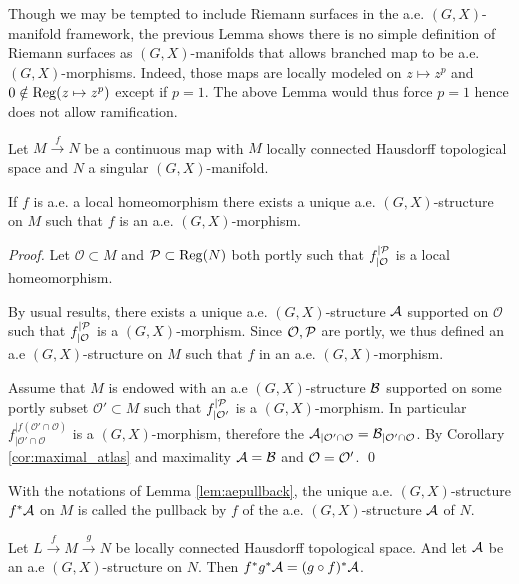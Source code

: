                 \begin{rem}
                 Though we may be tempted to include Riemann surfaces in the a.e. $(G,X)$-manifold framework, the previous Lemma shows there is no simple definition of Riemann surfaces as $(G,X)$-manifolds that allows branched map to be a.e. $(G,X)$-morphisms. Indeed, those maps are locally modeled on $z\mapsto z^p$ and $0\notin \reg(z\mapsto z^p)$ except if $p=1$. The above Lemma would thus force $p=1$ hence does not allow ramification.  
                \end{rem}
                \begin{lem}\label{lem:aepullback}
                    Let $M\xrightarrow{f} N$ be a continuous map with $M$ locally connected Hausdorff topological space and $N$ a singular $(G,X)$-manifold. 
                    
                    If $f$ is a.e. a local homeomorphism there exists a unique a.e. $(G,X)$-structure on $M$ such that $f$ is an a.e. $(G,X)$-morphism.
                \end{lem}
                \begin{proof} 
                 Let $\mathcal O\subset M$ and $\mathcal P\subset \reg(N)$  both portly such that $f_{|\mathcal O}^{|\P}$ is a local homeomorphism.
                 
                 By usual results, there exists a unique a.e. $(G,X)$-structure $\A$ supported on $\mathcal O$ such that $f_{|\mathcal O}^{|\P}$ is a $(G,X)$-morphism. 
                 Since $\mathcal O, \P$ are portly, we thus defined an a.e $(G,X)$-structure on $M$ such that $f$ in an a.e. $(G,X)$-morphism. 
                 
                 Assume that $M$ is endowed with an a.e $(G,X)$-structure $\B$ supported on some portly subset $\mathcal O'\subset M$ such that $f_{|\mathcal O'}^{|\P}$ is a $(G,X)$-morphism.  In particular $f_{|\mathcal O'\cap \mathcal O}^{|f(\mathcal O'\cap \mathcal O)}$ is a $(G,X)$-morphism, therefore the $\A_{|\mathcal O'\cap \mathcal O}=\B_{|\mathcal O'\cap \mathcal O}$. By Corollary \ref{cor:maximal_atlas} and maximality $\A=\B$ and $\O=\O'$.
                \qed\end{proof}
                \begin{defi}
                 With the notations of Lemma \ref{lem:aepullback}, the unique  a.e. $(G,X)$-structure $f^*\A$ on $M$ is called the pullback by $f$ of the a.e. $(G,X)$-structure $\A$ of $N$.
                 
                \end{defi}
                \begin{cor}
                 Let $L\xrightarrow{f}M\xrightarrow{g} N$ be locally connected Hausdorff topological space. And let $\A$ be an a.e $(G,X)$-structure on $N$. 
                 Then $f^*g^*\A = (g\circ f)^*\A$.
                \end{cor}


